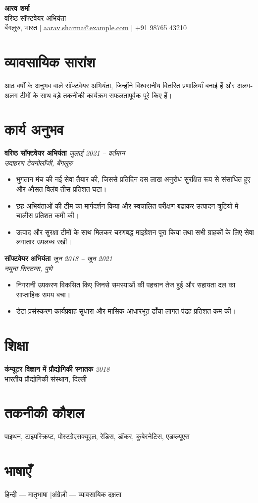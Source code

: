 \documentclass[11pt,a4paper]{article}
\begin{document}
\begin{center}
  {\LARGE\textbf{आरव शर्मा}}\\[3pt]
  वरिष्ठ सॉफ्टवेयर अभियंता\\[2pt]
  बेंगलुरु, भारत \quad|\quad
  \href{mailto:aarav.sharma@example.com}{aarav.sharma@example.com} \quad|\quad
  +91 98765 43210
\end{center}

\section{व्यावसायिक सारांश}
आठ वर्षों के अनुभव वाले सॉफ्टवेयर अभियंता, जिन्होंने विश्वसनीय वितरित प्रणालियाँ बनाई हैं और अलग-अलग टीमों के साथ बड़े तकनीकी कार्यक्रम सफलतापूर्वक पूरे किए हैं।

\section{कार्य अनुभव}
\noindent\textbf{वरिष्ठ सॉफ्टवेयर अभियंता} \hfill \textit{जुलाई 2021 -- वर्तमान}\\
\textit{उदाहरण टेक्नोलॉजी, बेंगलुरु}
\begin{itemize}
  \item भुगतान मंच की नई सेवा तैयार की, जिससे प्रतिदिन दस लाख अनुरोध सुरक्षित रूप से संसाधित हुए और औसत विलंब तीस प्रतिशत घटा।
  \item छह अभियंताओं की टीम का मार्गदर्शन किया और स्वचालित परीक्षण बढ़ाकर उत्पादन त्रुटियों में चालीस प्रतिशत कमी की।
  \item उत्पाद और सुरक्षा टीमों के साथ मिलकर चरणबद्ध माइग्रेशन पूरा किया तथा सभी ग्राहकों के लिए सेवा लगातार उपलब्ध रखी।
\end{itemize}

\noindent\textbf{सॉफ्टवेयर अभियंता} \hfill \textit{जून 2018 -- जून 2021}\\
\textit{नमूना सिस्टम्स, पुणे}
\begin{itemize}
  \item निगरानी उपकरण विकसित किए जिनसे समस्याओं की पहचान तेज हुई और सहायता दल का साप्ताहिक समय बचा।
  \item डेटा प्रसंस्करण कार्यप्रवाह सुधारा और मासिक आधारभूत ढाँचा लागत पंद्रह प्रतिशत कम की।
\end{itemize}

\section{शिक्षा}
\textbf{कंप्यूटर विज्ञान में प्रौद्योगिकी स्नातक} \hfill \textit{2018}\\
भारतीय प्रौद्योगिकी संस्थान, दिल्ली

\section{तकनीकी कौशल}
पाइथन, टाइपस्क्रिप्ट, पोस्टग्रेएसक्यूएल, रेडिस, डॉकर, कुबेरनेटिस, एडब्ल्यूएस

\section{भाषाएँ}
हिन्दी — मातृभाषा \quad|\quad अंग्रेज़ी — व्यावसायिक दक्षता
\end{document}
